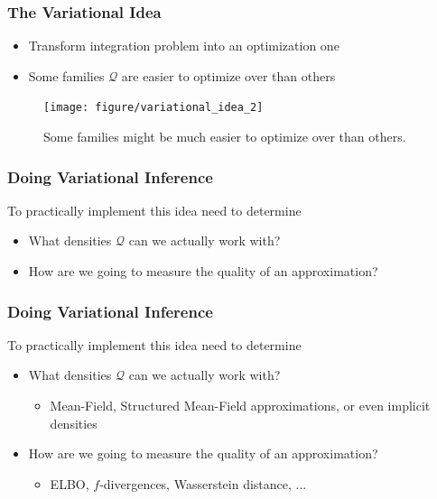 \documentclass[10pt,mathserif]{beamer}
\begin{document}
\begin{frame}
  \frametitle{The Variational Idea}
  \begin{itemize}
  \item Transform integration problem into an optimization one
  \item Some families $\mathcal{Q}$ are easier to optimize over than others
  \end{itemize}
\begin{figure}[ht]
  \centering
  \texttt{[image: figure/variational\_idea\_2]}
  \caption{Some families might be much easier to optimize over than others.
    \label{fig:variational_idea_2} }
\end{figure}
\end{frame}

\begin{frame}
  \frametitle{Doing Variational Inference}
  To practically implement this idea need to determine
  \begin{itemize}
  \item What densities $\mathcal{Q}$ can we actually work with?
  \item How are we going to measure the quality of an approximation?
  \end{itemize}
\end{frame}

\begin{frame}
  \frametitle{Doing Variational Inference}
  To practically implement this idea need to determine
  \begin{itemize}
  \item What densities $\mathcal{Q}$ can we actually work with?
    \begin{itemize}
    \item Mean-Field, Structured Mean-Field approximations, or even implicit densities
    \end{itemize}
  \item How are we going to measure the quality of an approximation?
    \begin{itemize}
    \item ELBO, $f$-divergences, Wasserstein distance, ...
    \end{itemize}
  \end{itemize}
\end{frame}
\end{document}
